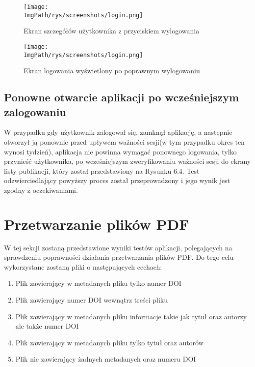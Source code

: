 \documentclass[a4paper,12pt,twoside,openany]{report}
\newcommand{\ImgPath}{.}
\begin{document}
\begin{figure}[!htbp]
	\begin{center}
		\centering
		\texttt{[image: \\ImgPath/rys/screenshots/login.png]}
	\end{center}
	\caption{Ekran szczegółów użytkownika z przyciskiem wylogowania}
	\label{zrzutLogowanieEkranUserDetails}
\end{figure}


\pagebreak


\begin{figure}[!htbp]
	\begin{center}
		\centering
		\texttt{[image: \\ImgPath/rys/screenshots/login.png]}
	\end{center}
	\caption{Ekran logowania wyświetlony po poprawnym wylogowaniu}
	\label{zrzutLogowaniePoWylogowaniu}
\end{figure}

\subsection{Ponowne otwarcie aplikacji po wcześniejszym zalogowaniu}
W przypadku gdy użytkownik zalogował się, zamknął aplikację, a następnie otworzył ją ponownie przed upływem ważności sesji(w tym przypadku okres ten wynosi tydzień), aplikacja nie powinna wymagać ponownego logowania, tylko przynieść użytkownika, po wcześniejszym zweryfikowaniu ważności sesji do ekrany listy publikacji, który został przedstawiony na Rysunku 6.4. Test odzwierciedlający powyższy proces został przeprowadzony i jego wynik jest zgodny z oczekiwaniami.

\section{Przetwarzanie plików PDF}
W tej sekcji zostaną przedstawione wyniki testów aplikacji, polegających na sprawdzeniu poprawności działania przetwarzania plików PDF. Do tego celu wykorzystane zostaną pliki o następujących cechach:
\begin{enumerate}
	\item Plik zawierający w metadanych pliku tylko numer DOI 
	\item Plik zawierający numer DOI wewnątrz treści pliku
	\item Plik zawierający w metadanych pliku informacje takie jak tytuł oraz autorzy ale także numer DOI 
	\item Plik zawierający w metadanych pliku tylko tytuł oraz autorów
	\item Plik nie zawierający żadnych metadanych oraz numeru DOI
\end{enumerate}

\begin{thebibliography}{99}



\end{thebibliography}

\zakonczenie  %
\end{document}
